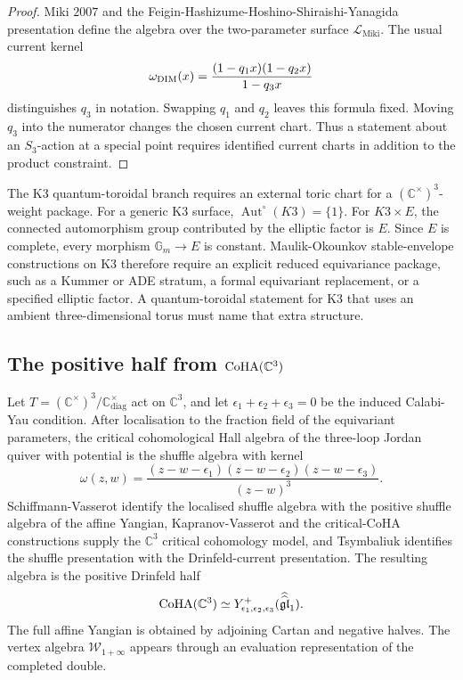 \begin{proof}
Miki \(2007\) and the Feigin-Hashizume-Hoshino-Shiraishi-Yanagida
presentation define the algebra over the two-parameter surface
\(\mathcal L_{\mathrm{Miki}}\).  The usual current kernel
\[
  \omega_{\mathrm{DIM}}(x)
  =
  \frac{(1-q_1x)(1-q_2x)}{1-q_3x}
\]
distinguishes \(q_3\) in notation.  Swapping \(q_1\) and \(q_2\)
leaves this formula fixed.  Moving \(q_3\) into the numerator changes
the chosen current chart.  Thus a statement about an \(S_3\)-action at
a special point requires identified current charts in addition to the
product constraint.
\end{proof}

\begin{remark}[K3 equivariance]
\label{rem:qtet-k3-equivariance}
The K3 quantum-toroidal branch requires an external toric chart for a
\((\mathbb C^\times)^3\)-weight package.  For a generic K3 surface,
\(\operatorname{Aut}^{\circ}(K3)=\{1\}\).  For \(K3\times E\), the
connected automorphism group contributed by the elliptic factor is
\(E\).  Since \(E\) is complete, every morphism
\(\mathbb G_m\to E\) is constant.
Maulik-Okounkov stable-envelope constructions on K3 therefore require
an explicit reduced equivariance package, such as a Kummer or ADE
stratum, a formal equivariant replacement, or a specified elliptic
factor.  A quantum-toroidal statement for K3 that uses an ambient
three-dimensional torus must name that extra structure.
\end{remark}

\subsection{The positive half from \texorpdfstring{$\mathrm{CoHA}(\mathbb C^3)$}{CoHA(C3)}}
\label{subsec:qtet-coha-positive-half}

\begin{theorem}
\label{thm:qtet-coha-positive-half}
Let \(T=(\mathbb C^\times)^3/\mathbb C^\times_{\mathrm{diag}}\) act on
\(\mathbb C^3\), and let
\(\epsilon_1+\epsilon_2+\epsilon_3=0\) be the induced Calabi-Yau
condition.  After localisation to the fraction field of the equivariant
parameters, the critical cohomological Hall algebra of the three-loop
Jordan quiver with potential is the shuffle algebra with kernel
\[
  \omega(z,w)
  =
  \frac{(z-w-\epsilon_1)(z-w-\epsilon_2)(z-w-\epsilon_3)}
       {(z-w)^3}.
\]
Schiffmann-Vasserot identify the localised shuffle algebra with the
positive shuffle algebra of the affine Yangian, Kapranov-Vasserot and
the critical-CoHA constructions supply the \(\mathbb C^3\) critical
cohomology model, and Tsymbaliuk identifies the shuffle
presentation with the Drinfeld-current presentation.  The resulting
algebra is the positive Drinfeld half
\[
  \mathrm{CoHA}(\mathbb C^3)\simeq Y^+_{\epsilon_1,\epsilon_2,\epsilon_3}
  (\widehat{\widehat{\mathfrak{gl}}}_1).
\]
The full affine Yangian is obtained by adjoining Cartan and negative
halves.  The vertex algebra \(\mathcal W_{1+\infty}\) appears through
an evaluation representation of the completed double.
\end{theorem}

